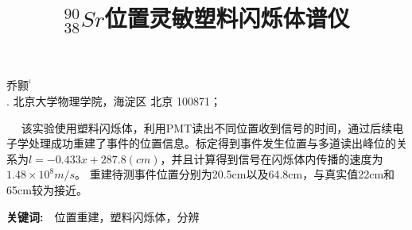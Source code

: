 \documentclass[a4paper,10.0pt,twoside]{npr}
\begin{document}
\setcounter{page}{001}%
\begin{center}
\title{%
\xiaoerhao \bf  %
$^{90}_{38}Sr$位置灵敏塑料闪烁体谱仪\\[-5mm]}
\maketitle
\large \fs
乔颢$^{^1}$\\[2mm]

\xiaowu {}. 北京大学物理学院，海淀区 北京 100871；\\[4mm]

 

\parbox{158mm} {
~~\fs
该实验使用塑料闪烁体，利用PMT读出不同位置收到信号的时间，通过后续电子学处理成功重建了事件的位置信息。标定得到事件发生位置与多道读出峰位的关系为$l=-0.433x+287.8(cm)$，并且计算得到信号在闪烁体内传播的速度为$1.48\times10^{8}m/s$。 重建待测事件位置分别为20.5cm以及64.8cm，与真实值22cm和65cm较为接近。

{\bf 关键词:}~~\fs 位置重建，塑料闪烁体，分辨}\\
\end{center}
\vspace{5mm}
\setcounter{section}{0}
\end{document}
